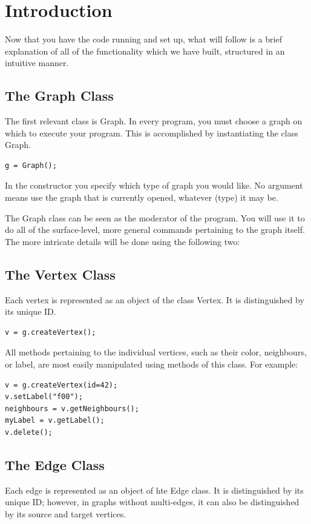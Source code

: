 \documentclass{article}
\newlength\q
\begin{document}
\section{Introduction}
Now that you have the code running and set up, what will follow is a brief explanation of all of the functionality which we have built, structured in an intuitive manner.

\subsection{The Graph Class}
The first relevant class is Graph. In every program, you must choose a graph on which to execute your program. This is accomplished by instantiating the class Graph. 

\begin{lstlisting}
g = Graph();
\end{lstlisting}

In the constructor you specify which type of graph you would like. No argument means use the graph that is currently opened, whatever (type) it may be.

The Graph class can be seen as the moderator of the program. You will use it to do all of the surface-level, more general commands pertaining to the graph itself. The more intricate details will be done using the following two:

\subsection{The Vertex Class}
Each vertex is represented as an object of the class Vertex. It is distinguished by its unique ID. 

\begin{lstlisting}
v = g.createVertex();
\end{lstlisting}

All methods pertaining to the individual vertices, such as their color, neighbours, or label, are most easily manipulated using methods of this class. For example:

\begin{lstlisting}
v = g.createVertex(id=42);
v.setLabel("f00");
neighbours = v.getNeighbours();
myLabel = v.getLabel();
v.delete();
\end{lstlisting}

\subsection{The Edge Class}
Each edge is represented as an object of hte Edge class. It is distinguished by its unique ID; however, in graphs without multi-edges, it can also be distinguished by its source and target vertices.
\end{document}

